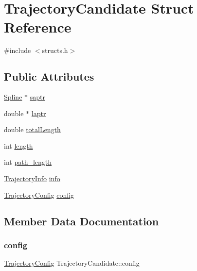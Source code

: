 \hypertarget{structTrajectoryCandidate}{}\section{Trajectory\+Candidate Struct Reference}
\label{structTrajectoryCandidate}


{\ttfamily \#include $<$structs.\+h$>$}

\subsection*{Public Attributes}
\begin{DoxyCompactItemize}
\item 
\mbox{\hyperlink{structSpline}{Spline}} $\ast$ \mbox{\hyperlink{structTrajectoryCandidate_aa9acdb495e4178040b338fda545e671c}{saptr}}
\item 
double $\ast$ \mbox{\hyperlink{structTrajectoryCandidate_af826bed560d28bc043a7b50688f1cdaa}{laptr}}
\item 
double \mbox{\hyperlink{structTrajectoryCandidate_a333f3e0ed261240bc43dbbffced79edb}{total\+Length}}
\item 
int \mbox{\hyperlink{structTrajectoryCandidate_af7361843fde96e0d8744e86b0c1a9e78}{length}}
\item 
int \mbox{\hyperlink{structTrajectoryCandidate_abdf2592c893acd3e47d3b2d5cf6865c0}{path\+\_\+length}}
\item 
\mbox{\hyperlink{structTrajectoryInfo}{Trajectory\+Info}} \mbox{\hyperlink{structTrajectoryCandidate_afe3565a16083e34fa3e2bbe956f352ea}{info}}
\item 
\mbox{\hyperlink{structTrajectoryConfig}{Trajectory\+Config}} \mbox{\hyperlink{structTrajectoryCandidate_aa1897c9d366ee5de20c5bcec66b62946}{config}}
\end{DoxyCompactItemize}


\subsection{Member Data Documentation}
\mbox{\label{structTrajectoryCandidate_aa1897c9d366ee5de20c5bcec66b62946}} 
\subsubsection{\texorpdfstring{config}{config}}
{\footnotesize\ttfamily \mbox{\hyperlink{structTrajectoryConfig}{Trajectory\+Config}} Trajectory\+Candidate\+::config}

